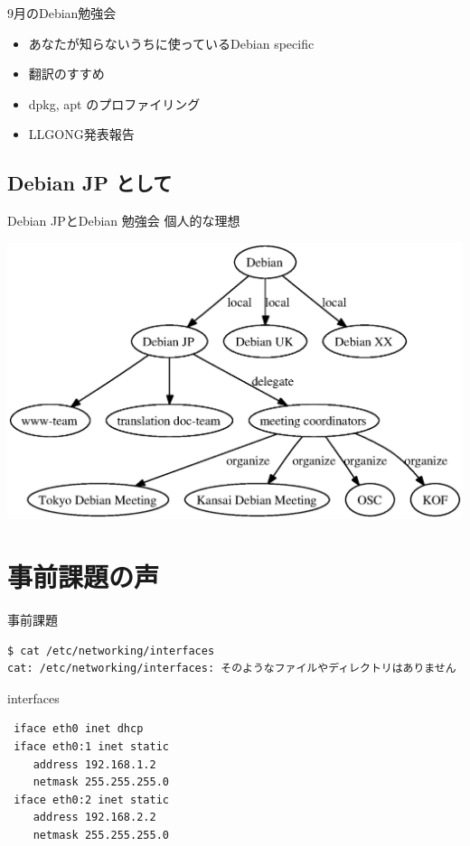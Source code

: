 \documentclass[cjk,dvipdfmx]{beamer}
\begin{document}
\begin{frame}{9月のDebian勉強会}
 \begin{itemize}
  \item あなたが知らないうちに使っているDebian specific
  \item 翻訳のすすめ
  \item dpkg, apt のプロファイリング
  \item LLGONG発表報告
 \end{itemize}
\end{frame}


\subsection{Debian JP として}

\begin{frame}{Debian JPとDebian 勉強会}
個人的な理想

\includegraphics[width=0.7\hsize]{image200610/debianstructure.eps}

\end{frame}

\section{事前課題の声}

\begin{frame}[containsverbatim]{事前課題}
\begin{verbatim}
$ cat /etc/networking/interfaces 
cat: /etc/networking/interfaces: そのようなファイルやディレクトリはありません
\end{verbatim}
\end{frame}

\begin{frame}[containsverbatim]{interfaces}
\begin{verbatim}
 iface eth0 inet dhcp
 iface eth0:1 inet static
    address 192.168.1.2
    netmask 255.255.255.0
 iface eth0:2 inet static
    address 192.168.2.2
    netmask 255.255.255.0
\end{verbatim} 
\end{frame}
\end{document}
